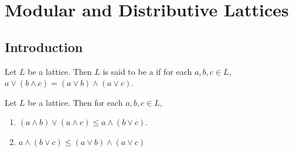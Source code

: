 \documentclass{book}
\begin{document}
	
	
	
	
	
	
	
	
	
	
	
	
	
	
	
	
	
	
	
	
	
\section{Modular and Distributive Lattices}
	
	\subsection{Introduction}

	\begin{defn}
		Let $L$ be a lattice. Then $L$ is said to be a  if for each $a,b,c \in L$, $a \vee (b \wedge c) = (a \vee b) \wedge (a \vee c)$.
	\end{defn}
	
	\begin{ex}
		Let $L$ be a lattice. Then for each $a,b,c \in L$,
		\begin{enumerate}
			\item $(a \wedge b) \vee (a \wedge c) \leq a \wedge (b \vee c)$.
			\item $a \wedge (b \vee c) \leq (a \vee b) \wedge (a \vee c)$
		\end{enumerate}
	\end{ex}
	
\end{document}
